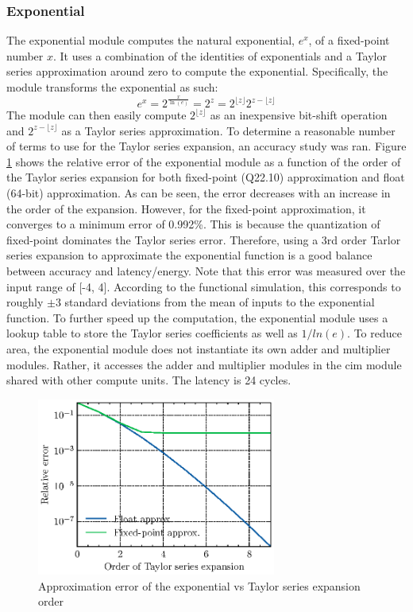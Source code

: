 \subsubsection{Exponential}
The exponential module computes the natural exponential, $e^{x}$, of a fixed-point number $x$. It uses a combination of the identities of exponentials and a Taylor series approximation around
zero to compute the exponential. Specifically, the module transforms the exponential as such:
\begin{equation}
    e^{x} = 2^{\frac{x}{\ln(e)}} = 2^{z} = 2^{\lfloor{z}\rfloor}2^{z-\lfloor{z}\rfloor}
    \label{eq:exp_transform}
\end{equation}
The module can then easily compute $2^{\lfloor{z}\rfloor}$ as an inexpensive bit-shift operation and $2^{z-\lfloor{z}\rfloor}$ as a Taylor series approximation. To determine a reasonable
number of terms to use for the Taylor series expansion, an accuracy study was ran. Figure \ref{fig:exp_error} shows the relative error of the exponential module as a function of the order
of the Taylor series expansion for both fixed-point (Q22.10) approximation and float (64-bit) approximation. As can be seen, the error decreases with an increase in the order of the expansion.
However, for the fixed-point approximation, it converges to a minimum error of 0.992\%. This is because the quantization of fixed-point dominates the Taylor series error. Therefore, using
a 3rd order Tarlor series expansion to approximate the exponential function is a good balance between accuracy and latency/energy. Note that this error was measured over the input range of
[-4, 4]. According to the functional simulation, this corresponds to roughly $\pm3$ standard deviations from the mean of inputs to the exponential function. To further speed up the computation,
the exponential module uses a lookup table to store the Taylor series coefficients as well as $1/ln(e)$. To reduce area, the exponential module does not instantiate its own adder and multiplier
modules. Rather, it accesses the adder and multiplier modules in the \ac{cim} module shared with other compute units. The latency is 24 cycles.

\begin{figure}
    \centering
    \includegraphics[width=0.7\textwidth]{assets/exp_approx_error/exp_approx_error.eps}
    \caption{Approximation error of the exponential vs Taylor series expansion order}
    \label{fig:exp_error}
\end{figure}

